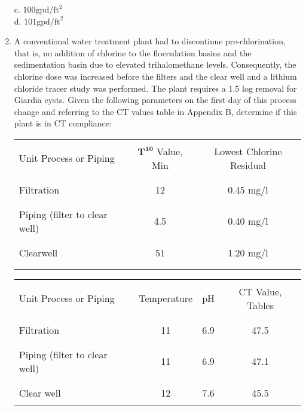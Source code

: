 \begin{enumerate}
c. $100 \mathrm{gpd} / \mathrm{ft}^{2}$\\
d. $101 \mathrm{gpd} / \mathrm{ft}^{2}$ \\
\item A conventional water treatment plant had to discontinue pre-chlorination, that is, no addition of chlorine to the flocculation basins and the sedimentation basin due to elevated trihalomethane levels. Consequently, the chlorine dose was increased before the filters and the clear well and a lithium chloride tracer study was performed. The plant requires a 1.5 log removal for Giardia cysts. Given the following parameters on the first day of this process change and referring to the CT values table in Appendix B, determine if this plant is in CT compliance:\\
\begin{center}
\begin{tabular}{|l|c|c|}
\hline\\
Unit Process or Piping & $\mathbf{T}^{\mathbf{1 0}}$ Value, Min & Lowest Chlorine Residual \\\\
\hline\\
Filtration & 12 & 0.45 mg/l \\\\
\hline\\
Piping (filter to clear well) & 4.5 & 0.40 mg/l \\\\
\hline\\
Clearwell & 51 & 1.20 mg/l \\\\
\hline\\
\end{tabular}
\end{center}
\begin{center}
\begin{tabular}{|l|c|c|c|}
\hline\\
Unit Process or Piping & Temperature & pH & CT Value, Tables \\\\
\hline\\
Filtration & 11 & 6.9 & 47.5 \\\\
\hline\\
Piping (filter to clear well) & 11 & 6.9 & 47.1 \\\\
\hline\\
Clear well & 12 & 7.6 & 45.5 \\\\

\end{tabular}
\end{center}
\end{enumerate}
